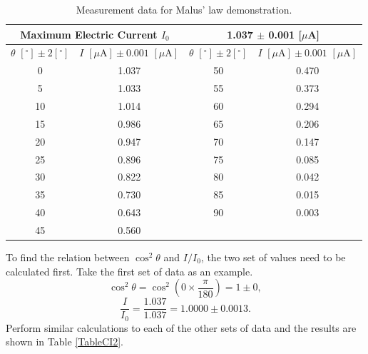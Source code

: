 \documentclass{article}
\begin{document}
\begin{table}[H]\centering
\begin{tabular}{cc||cc}
\toprule
\multicolumn{2}{c}{Maximum Electric Current $I_0$} & \multicolumn{2}{c}{1.037 $\pm$ 0.001 [$\mu$A]}\\
\midrule
$\theta\,\,[^\circ] \pm 2[^\circ]$ & $I\,\,[\mu\text{A}] \pm 0.001\,\,[\mu\text{A}]$ & $\theta\,\,[^\circ] \pm 2[^\circ]$ & $I\,\,[\mu\text{A}] \pm 0.001\,\,[\mu\text{A}]$\\
\midrule
    0     & 1.037 & 50    & 0.470 \\
    5     & 1.033 & 55    & 0.373 \\
    10    & 1.014 & 60    & 0.294 \\
    15    & 0.986 & 65    & 0.206 \\
    20    & 0.947 & 70    & 0.147 \\
    25    & 0.896 & 75    & 0.085 \\
    30    & 0.822 & 80    & 0.042 \\
    35    & 0.730 & 85    & 0.015 \\
    40    & 0.643 & 90    & 0.003 \\
    45    & 0.560 &       &  \\
\bottomrule
\end{tabular}
\caption{Measurement data for Malus' law demonstration.}\label{TableMalus}
\end{table}

To find the relation between $\cos^2\theta$ and $I/I_0$, the two set of values need to be calculated first.
Take the first set of data as an example.
$$\cos^2\theta = \cos^2(0 \times \frac{\pi}{180}) = 1 \pm 0,$$
$$\frac{I}{I_0} = \frac{1.037}{1.037} = 1.0000 \pm 0.0013.$$
Perform similar calculations to each of the other sets of data and the results are shown in Table \ref{TableCI2}.
\end{document}
